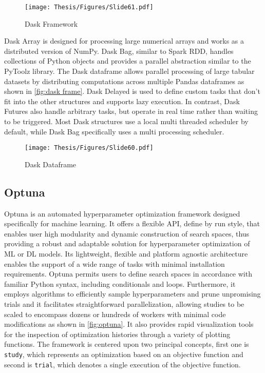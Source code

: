 \clearpage

\begin{figure}[h]
\centering
\texttt{[image: Thesis/Figures/Slide61.pdf]}
\caption{\label{fig:dask}Dask Framework \cite{dask_docs}}
\end{figure}

Dask Array is designed for processing large numerical arrays and works as a distributed version of NumPy. Dask Bag, similar to Spark RDD, handles collections of Python objects and provides a parallel abstraction similar to the PyToolz library. The Dask dataframe allows parallel processing of large tabular datasets by distributing computations across multiple Pandas dataframes as shown in \autoref{fig:dask frame}. Dask Delayed is used to define custom tasks that don't fit into the other structures and supports lazy execution. In contrast, Dask Futures also handle arbitrary tasks, but operate in real time rather than waiting to be triggered. Most Dask structures use a local multi threaded scheduler by default, while Dask Bag specifically uses a multi processing scheduler. \cite{dugre2019performance}

\begin{figure}[h]
\centering
\texttt{[image: Thesis/Figures/Slide60.pdf]}
\caption{\label{fig:dask frame}Dask Dataframe \cite{dask_docs}}
\end{figure}

\clearpage

\subsection{Optuna}

Optuna is an automated hyperparameter optimization framework designed specifically for machine learning. It offers a flexible API, define by run style, that enables user high modularity and dynamic construction of search spaces, thus providing a robust and adaptable solution for hyperparameter optimization of ML or DL models. Its lightweight, flexible and platform agnostic architecture enables the support of a wide range of tasks with minimal installation requirements. Optuna permits users to define search spaces in accordance with familiar Python syntax, including conditionals and loops. Furthermore, it employs algorithms to efficiently sample hyperparameters and prune unpromising trials and it facilitates straightforward parallelization, allowing studies to be scaled to encompass dozens or hundreds of workers with minimal code modifications as shown in \autoref{fig:optuna}. It also provides rapid visualization tools for the inspection of optimization histories through a variety of plotting functions. The framework is centered upon two principal concepts, first one is \texttt{study}, which represents an optimization based on an objective function and second is \texttt{trial}, which denotes a single execution of the objective function. \cite{optuna_docs}

